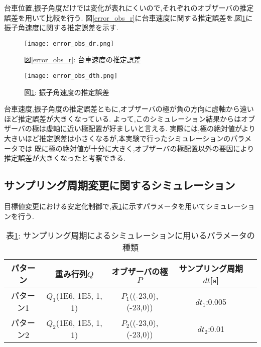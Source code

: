 台車位置,振子角度だけでは変化が表れにくいので,それぞれのオブザーバの推定誤差を用いて比較を行う.
図\ref{error_obs_r}に台車速度に関する推定誤差を,図\ref{error_obs_th}に振子角速度に関する推定誤差を示す.

\begin{figure}[htbp]
    \begin{minipage}{0.5\hsize}
        \begin{center}
            \texttt{[image: error\_obs\_dr.png]}
            \caption{図\ref{error_obs_r}: 台車速度の推定誤差}
            \label{error_obs_r}
        \end{center}
    \end{minipage}
    \begin{minipage}{0.5\hsize}
        \begin{center}
            \texttt{[image: error\_obs\_dth.png]}
            \caption{図\ref{error_obs_th}: 振子角速度の推定誤差}
            \label{error_obs_th}
        \end{center}
    \end{minipage}
\end{figure}

台車速度,振子角度の推定誤差ともに,オブザーバの極が負の方向に虚軸から遠いほど推定誤差が大きくなっている.
よって,このシミュレーション結果からはオブザーバの極は虚軸に近い極配置が好ましいと言える.
実際には,極の絶対値がより大きいほど推定誤差は小さくなるが,本実験で行ったシミュレーションのパラメータでは
既に極の絶対値が十分に大きく,オブザーバの極配置以外の要因により推定誤差が大きくなったと考察できる.


\subsection{サンプリング周期変更に関するシミュレーション}
目標値変更における安定化制御で,表\ref{sim_Dt}に示すパラメータを用いてシミュレーションを行う.

\begin{table}[htbp]
    \begin{center}
        \caption{表\ref{sim_Dt}: サンプリング周期によるシミュレーションに用いるパラメータの種類}
        \begin{tabular}{|c|c|c|c|c|} \hline
            パターン & 重み行列$Q$ & オブザーバの極$P$ & サンプリング周期$dt$[s] \\ \hline \hline
            パターン1 & $Q_1$(1E6, 1E5, 1, 1) & $P_1$((-23,0), (-23,0)) & $dt_1$:0.005 \\ \hline
            パターン2 & $Q_2$(1E6, 1E5, 1, 1) & $P_2$((-23,0), (-23,0)) & $dt_2$:0.01 \\ \hline
        \end{tabular}
        \label{sim_Dt}
    \end{center}
\end{table}

